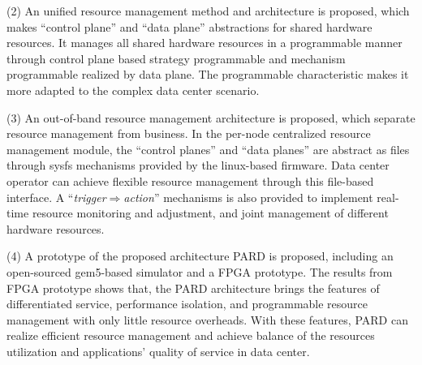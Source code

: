 \begin{eabstract}
  (2) An unified resource management method and architecture is proposed,
      which makes ``control plane'' and ``data plane'' abstractions for
      shared hardware resources.
      It manages all shared hardware resources in a programmable manner through
      control plane based strategy programmable and
      mechanism programmable realized by data plane.
      The programmable characteristic makes it more adapted to the complex
      data center scenario.

  (3) An out-of-band resource management architecture is proposed,
      which separate resource management from business.
      In the per-node centralized resource management module, 
      the ``control planes'' and ``data planes'' are abstract as files
      through sysfs mechanisms provided by the linux-based firmware.
      Data center operator can achieve flexible resource management through 
      this file-based interface.
      A ``\emph{trigger$\Rightarrow$action}'' mechanisms is also provided to implement
      real-time resource monitoring and adjustment, and joint management of different
      hardware resources.

  (4) A prototype of the proposed architecture PARD is proposed,
      including an open-sourced gem5-based simulator and a FPGA prototype.
      The results from FPGA prototype shows that, the PARD architecture brings
      the features of differentiated service, performance isolation,
      and programmable resource management with only little resource overheads.
      With these features, PARD can realize efficient resource management and
      achieve balance of the resources utilization and
      applications' quality of service in data center.



\end{eabstract}


